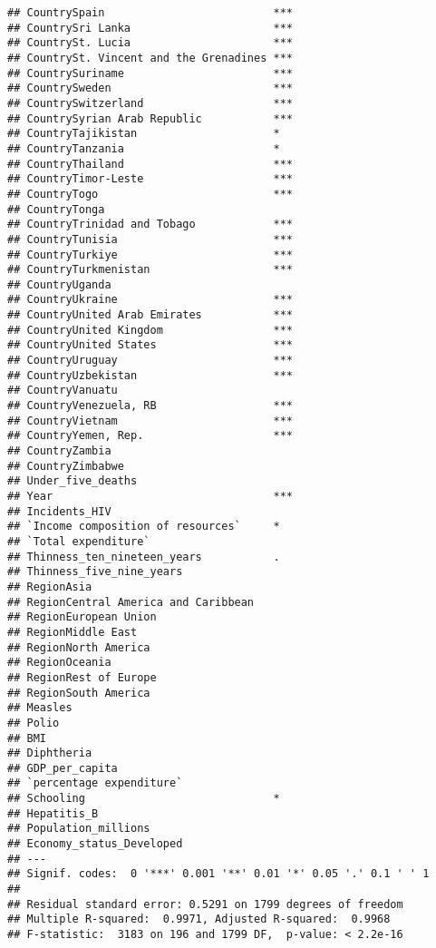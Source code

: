 \documentclass[
]{article}
\begin{document}
\begin{verbatim}
## CountrySpain                          ***
## CountrySri Lanka                      ***
## CountrySt. Lucia                      ***
## CountrySt. Vincent and the Grenadines ***
## CountrySuriname                       ***
## CountrySweden                         ***
## CountrySwitzerland                    ***
## CountrySyrian Arab Republic           ***
## CountryTajikistan                     *  
## CountryTanzania                       *  
## CountryThailand                       ***
## CountryTimor-Leste                    ***
## CountryTogo                           ***
## CountryTonga                             
## CountryTrinidad and Tobago            ***
## CountryTunisia                        ***
## CountryTurkiye                        ***
## CountryTurkmenistan                   ***
## CountryUganda                            
## CountryUkraine                        ***
## CountryUnited Arab Emirates           ***
## CountryUnited Kingdom                 ***
## CountryUnited States                  ***
## CountryUruguay                        ***
## CountryUzbekistan                     ***
## CountryVanuatu                           
## CountryVenezuela, RB                  ***
## CountryVietnam                        ***
## CountryYemen, Rep.                    ***
## CountryZambia                            
## CountryZimbabwe                          
## Under_five_deaths                        
## Year                                  ***
## Incidents_HIV                            
## `Income composition of resources`     *  
## `Total expenditure`                      
## Thinness_ten_nineteen_years           .  
## Thinness_five_nine_years                 
## RegionAsia                               
## RegionCentral America and Caribbean      
## RegionEuropean Union                     
## RegionMiddle East                        
## RegionNorth America                      
## RegionOceania                            
## RegionRest of Europe                     
## RegionSouth America                      
## Measles                                  
## Polio                                    
## BMI                                      
## Diphtheria                               
## GDP_per_capita                           
## `percentage expenditure`                 
## Schooling                             *  
## Hepatitis_B                              
## Population_millions                      
## Economy_status_Developed                 
## ---
## Signif. codes:  0 '***' 0.001 '**' 0.01 '*' 0.05 '.' 0.1 ' ' 1
## 
## Residual standard error: 0.5291 on 1799 degrees of freedom
## Multiple R-squared:  0.9971, Adjusted R-squared:  0.9968 
## F-statistic:  3183 on 196 and 1799 DF,  p-value: < 2.2e-16
\end{verbatim}
\end{document}

